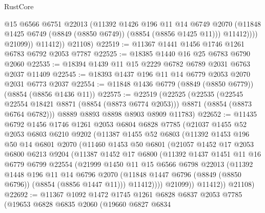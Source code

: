 \begin{lexlean}{RustCore}
\begin{coremodule}
                    @15
                    @6566
                    @6751
                    @22013
                    (@11392
                      @1426
                      @196
                      @11
                      @14
                      @6749
                      @2070
                      (@11848 @1425 @6749 (@8849 (@8850 @6749)) (@8854 (@8856 @1425 @11)))
                      @11412))))
              @21099))
          @11412))
      @21108)
@22519 := @11367 @1441 @1456 @1746 @1261 @6783 @6792 @2053 @7787
@22525 := @18385 @1440 @16 @25 @6783 @6790 @2060
@22535 := @18394 @1439 @11 @15 @2229 @6782 @6789 @2031 @6763 @2037 @11409
@22545 := @18393 @1437 @196 @11 @14 @6779 @2053 @2070 @2031 @6773 @2037
@22554 := @11848 @1436 @6779 (@8849 (@8850 @6779)) (@8854 (@8856 @1436 @11))
@22575 := @22519
    (@22525
      (@22535
        (@22545 @22554 @18421 @8871 (@8854 (@8873 @6774 @2053)))
        @8871
        (@8854 (@8873 @6764 @6782)))
      @8889
      @8893
      @8898
      @8903
      @8909
      @11783)
@22652 := @11435
    @6792
    @1456
    @1746
    @1261
    @2053
    @6804
    @6828
    @7785
    (@21037
      @1455
      @52
      @2053
      @6803
      @6210
      @9202
      (@11387
        @1455
        @52
        @6803
        (@11392
          @1453
          @196
          @50
          @14
          @6801
          @2070
          (@11460
            @1453
            @50
            @6801
            (@21057
              @1452
              @17
              @2053
              @6800
              @6213
              @9204
              (@11387
                @1452
                @17
                @6800
                (@11392
                  @1437
                  @1451
                  @11
                  @16
                  @6779
                  @6799
                  @22554
                  (@21999
                    @1450
                    @11
                    @15
                    @6566
                    @6798
                    @22013
                    (@11392
                      @1448
                      @196
                      @11
                      @14
                      @6796
                      @2070
                      (@11848 @1447 @6796 (@8849 (@8850 @6796)) (@8854 (@8856 @1447 @11)))
                      @11412))))
              @21099))
          @11412))
      @21108)
@22692 := @11367
    @1092
    @1472
    @1745
    @1261
    @6828
    @6837
    @2053
    @7785
    (@19653
      @6828
      @6835
      @2060
      (@19660
        @6827
        @6834

\end{coremodule}
\end{lexlean}
